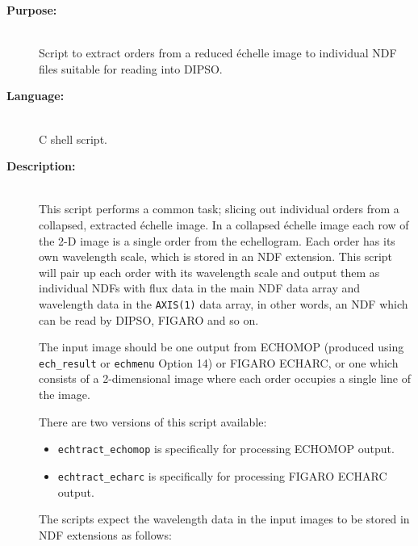 \documentclass[twoside,11pt]{article}
\newcommand{\xref}[3]{#1}
\begin{document}
\begin{description}

\item [{\bf Purpose:}] \mbox{} \\
     Script to extract orders from a reduced \'{e}chelle image to
     individual NDF files suitable for reading into \xref{DIPSO}{sun50}{}.

\item [{\bf Language:}] \mbox{} \\
     C shell script.

\item [{\bf Description:}] \mbox{} \\
     This script performs a common task; slicing out individual orders
     from a collapsed, extracted \'{e}chelle image.  In a collapsed \'{e}chelle
     image each row of the 2-D image is a single order from the
     echellogram.   Each order has its own wavelength scale, which is
     stored in an \xref{NDF}{sun33}{} \xref{extension}{sun33}{extensions}.
     This script will pair up each order
     with its wavelength scale and output them as individual NDFs with
     flux data in the main NDF data array and wavelength data in the
     \verb+AXIS(1)+ data array, in other words, an NDF which can be read
     by DIPSO, \xref{FIGARO}{sun86}{} and so on.

     The input image should be one output from \xref{ECHOMOP}{sun152}{}
     (produced using \xref{{\tt ech\_result}}{sun152}{ech_result} or
     \xref{{\tt echmenu} Option 14}{sun152}{option14}) or FIGARO
     \xref{ECHARC}{sun86}{ECHARC}, or one which consists of a
     2-dimensional image where each order occupies a single line of the
     image.

     There are two versions of this script available:

\begin{itemize}

\item \verb+echtract_echomop+ is specifically for processing ECHOMOP
      output.

\item \verb+echtract_echarc+ is specifically for processing FIGARO ECHARC
      output.

\end{itemize}

     The scripts expect the wavelength data in the input images to be stored
     in NDF extensions as follows:

\begin{itemize}


\end{itemize}
\end{description}
\end{document}
